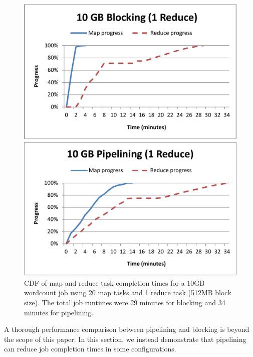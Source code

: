 \begin{figure}[t]
\ssp
\begin{minipage}{0.5\linewidth}
  \centering
        \includegraphics[width=0.95\linewidth]{figures/wc_10gb_20m1r_blocking}
\end{minipage}
\begin{minipage}{0.5\linewidth}
  \centering
        \includegraphics[width=0.95\linewidth]{figures/wc_10gb_20m1r_pipeline}
\end{minipage}
\caption{CDF of map and reduce task completion times for a 10GB wordcount job
  using 20 map tasks and 1 reduce task (512MB block size). The total job
  runtimes were 29 minutes for blocking and 34 minutes for pipelining.}
\label{fig:wc3}
\end{figure}

A thorough performance comparison between pipelining and blocking is beyond the
scope of this paper. In this section, we instead demonstrate that pipelining can
reduce job completion times in some configurations.

